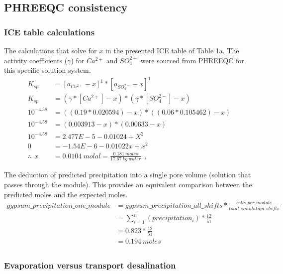 \subsection{PHREEQC consistency}

\subsubsection{ICE table calculations}
The calculations that solve for $x$ in the presented ICE table of Table 1a. The activity coefficients ($\gamma$) for $Ca^{2+}$ and $SO_4^{2-}$ were sourced from PHREEQC for this specific solution system.
\begin{equation} \label{ice_calculations}
    \begin{split}
        K_{sp} &= [a_{Ca^{2+}} - x]^1 * [a_{SO_4^{2-}} - x]^1 \\ 
        K_{sp} &= (\gamma*[Ca^{2+}] - x) * (\gamma*[SO_4^{2-}] - x) \\ 
        10^{-4.58} &= ((0.19*0.020594) - x) * ((0.06*0.105462) - x) \\ 
        10^{-4.58} &= (0.003913 - x) * (0.00633 - x) \\
        10^{-4.58} &= 2.477E-5 - 0.01024 + X^2 \\
        0 &= -1.54E-6 - 0.01022x + x^2 \\
         \therefore ~~ x &= 0.0104~molal = \frac{0.181~moles}{17.67~kg~water}~~,
    \end{split}
\end{equation}

The deduction of predicted precipitation into a single pore volume (solution that passes through the module). This provides an equivalent comparison between the predicted moles and the expected moles.
\begin{equation} \label{PHREEQC_output_precipitation}
    \begin{split}
        gypsum\_precipitation\_one\_module &= gypsum\_precipitation\_all\_shifts * \frac{cells\_per\_module}{total\_simulation\_shifts} \\
         &= \sum_{i=1}^n (precipitation_i) * \frac{12}{51} \\ 
         &= 0.823 * \frac{12}{51} \\ 
         &= 0.194 ~moles \\
    \end{split}
\end{equation}

\subsubsection{Evaporation versus transport desalination}

